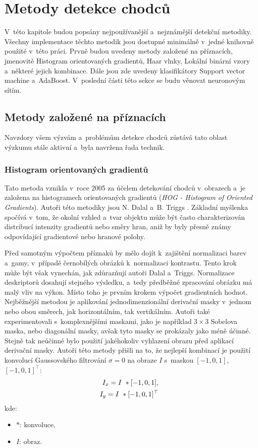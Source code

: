 \section{Metody detekce chodců}
V~této kapitole budou popsány nejpoužívanější a~nejznámější detekční metodiky. Všechny implementace těchto metodik jsou dostupné minimálně v~jedné knihovně použité v~této práci. Prvně budou uvedeny metody založené na příznacích, jmenovitě Histogram orientovaných gradientů, Haar vlnky, Lokální binární vzory a~některé jejich kombinace. Dále jsou zde uvedeny klasifikátory Support vector machine a~AdaBoost. V~poslední části této sekce se budu věnovat neuronovým sítím. 

\subsection{Metody založené na příznacích}
Navzdory všem výzvám a~problémům detekce chodců zůstává tato oblast výzkumu stále aktivní a~byla navržena řada technik.
\subsubsection*{Histogram orientovaných gradientů}
Tato metoda vznikla v~roce 2005 za účelem detekování chodců v~obrazech a~je založena na histogramech orientovaných gradientů (\textit{HOG - Histogram of Oriented Gradients}). Autoři této metodiky jsou N. Dalal a~B. Triggs \cite{hog:dalal}. Základní myšlenka spočívá v~tom, že okolní vzhled a~tvar objektu může být často charakterizován distribucí intenzity gradientů nebo směry hran, aniž by byly přesně známy odpovídající gradientové nebo hranové polohy.  

Před samotným výpočtem příznaků by mělo dojít k~zajištění normalizaci barev a~gamy, v~případě černobílých obrázků k~normalizaci kontrastu. Tento krok může být však vynechán, jak zdůrazňují autoři Dalal a~Triggs. Normalizace deskriptorů dosahují stejného výsledku, a~tedy předběžné zpracování obrázku má malý vliv na výkon. Místo toho je prvním krokem výpočet gradientních hodnot. Nejběžnější metodou je aplikování jednodimenzionální derivační masky v~jednom nebo obou směrech, jak horizontálním, tak vertikálním. Autoři také experimentovali s~komplexnějšími maskami, jako je například $3\times3$ Sobelova maska, nebo diagonální masky, avšak tyto masky se prokázaly jako méně účinné. Stejně tak neúčinné bylo použití jakéhokoliv vyhlazení obrazu před aplikací derivační masky. Autoři této metody přišli na to, že nejlepší kombinací je použití konvolucí Gaussovského filtrování $\sigma = 0$ na obraze $I$ s~maskou $[-1, 0, 1]$, $[-1,0,1]^\top$:
\begin{equation*}
\centering
 \label{eq:hogMask}
 \begin{aligned}
I_x = I~* [-1, 0, 1], \\
I_y = I~* [-1, 0, 1]^\top
 \end{aligned}
\end{equation*}
kde:
\begin{itemize}[label=]
  \item $*$: konvoluce,
  \item $I$: obraz.
\end{itemize}


